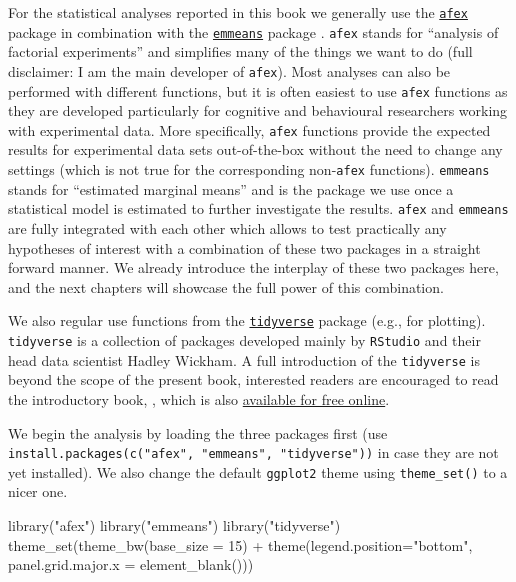 \documentclass[
]{book}
\newenvironment{Shaded}{\begin{snugshade}}{\end{snugshade}}
\newcommand{\AttributeTok}[1]{\textcolor[rgb]{0.77,0.63,0.00}{#1}}
\newcommand{\DecValTok}[1]{\textcolor[rgb]{0.00,0.00,0.81}{#1}}
\newcommand{\FunctionTok}[1]{\textcolor[rgb]{0.00,0.00,0.00}{#1}}
\newcommand{\NormalTok}[1]{#1}
\newcommand{\SpecialCharTok}[1]{\textcolor[rgb]{0.00,0.00,0.00}{#1}}
\newcommand{\StringTok}[1]{\textcolor[rgb]{0.31,0.60,0.02}{#1}}
\begin{document}
For the statistical analyses reported in this book we generally use the \href{https://cran.r-project.org/package=afex}{\texttt{afex}} package \citep{R-afex} in combination with the \href{https://cran.r-project.org/package=emmeans}{\texttt{emmeans}} package \citep{lenth2021}. \texttt{afex} stands for ``analysis of factorial experiments'' and simplifies many of the things we want to do (full disclaimer: I am the main developer of \texttt{afex}). Most analyses can also be performed with different functions, but it is often easiest to use \texttt{afex} functions as they are developed particularly for cognitive and behavioural researchers working with experimental data. More specifically, \texttt{afex} functions provide the expected results for experimental data sets out-of-the-box without the need to change any settings (which is not true for the corresponding non-\texttt{afex} functions). \texttt{emmeans} stands for ``estimated marginal means'' and is the package we use once a statistical model is estimated to further investigate the results. \texttt{afex} and \texttt{emmeans} are fully integrated with each other which allows to test practically any hypotheses of interest with a combination of these two packages in a straight forward manner. We already introduce the interplay of these two packages here, and the next chapters will showcase the full power of this combination.

We also regular use functions from the \href{https://cran.r-project.org/package=tidyverse}{\texttt{tidyverse}} package (e.g., for plotting). \texttt{tidyverse} is a collection of packages developed mainly by \texttt{RStudio} and their head data scientist Hadley Wickham. A full introduction of the \texttt{tidyverse} is beyond the scope of the present book, interested readers are encouraged to read the introductory book, \citet{wickham2017}, which is also \href{https://r4ds.had.co.nz/}{available for free online}.

We begin the analysis by loading the three packages first (use \texttt{install.packages(c("afex",\ "emmeans",\ "tidyverse"))} in case they are not yet installed). We also change the default \texttt{ggplot2} theme using \texttt{theme\_set()} to a nicer one.

\begin{Shaded}
\begin{Highlighting}[]
\FunctionTok{library}\NormalTok{(}\StringTok{"afex"}\NormalTok{)}
\FunctionTok{library}\NormalTok{(}\StringTok{"emmeans"}\NormalTok{)}
\FunctionTok{library}\NormalTok{(}\StringTok{"tidyverse"}\NormalTok{)}
\FunctionTok{theme\_set}\NormalTok{(}\FunctionTok{theme\_bw}\NormalTok{(}\AttributeTok{base\_size =} \DecValTok{15}\NormalTok{) }\SpecialCharTok{+} 
            \FunctionTok{theme}\NormalTok{(}\AttributeTok{legend.position=}\StringTok{"bottom"}\NormalTok{, }
                  \AttributeTok{panel.grid.major.x =} \FunctionTok{element\_blank}\NormalTok{()))}
\end{Highlighting}
\end{Shaded}
\end{document}
